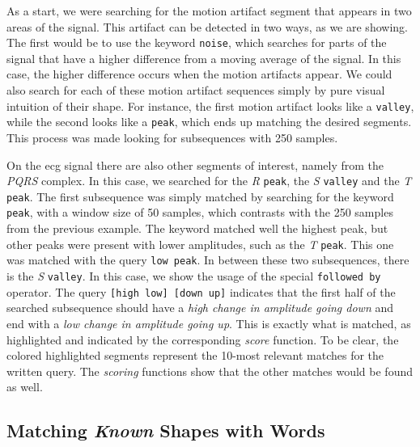 As a start, we were searching for the motion artifact segment that appears in two areas of the signal. This artifact can be detected in two ways, as we are showing. The first would be to use the keyword \texttt{noise}, which searches for parts of the signal that have a higher difference from a moving average of the signal. In this case, the higher difference occurs when the motion artifacts appear. We could also search for each of these motion artifact sequences simply by pure visual intuition of their shape. For instance, the first motion artifact looks like a \texttt{valley}, while the second looks like a \texttt{peak}, which ends up matching the desired segments. This process was made looking for subsequences with 250 samples.
\par
On the \gls{ecg} signal there are also other segments of interest, namely from the \textit{PQRS} complex. In this case, we searched for the \textit{R} \texttt{peak}, the \textit{S} \texttt{valley} and the \textit{T} \texttt{peak}. The first subsequence was simply matched by searching for the keyword \texttt{peak}, with a window size of 50 samples, which contrasts with the 250 samples from the previous example. The keyword matched well the highest peak, but other peaks were present with lower amplitudes, such as the \textit{T} \texttt{peak}. This one was matched with the query \texttt{low peak}. In between these two subsequences, there is the \textit{S} \texttt{valley}. In this case, we show the usage of the special \texttt{followed by} operator. The query \texttt{[high low] [down up]} indicates that the first half of the searched subsequence should have a \textit{high change in amplitude going down} and end with a \textit{low change in amplitude going up}. This is exactly what is matched, as highlighted and indicated by the corresponding \textit{score} function. To be clear, the colored highlighted segments represent the 10-most relevant matches for the written query. The \textit{scoring} functions show that the other matches would be found as well.



\subsection{Matching \textit{Known} Shapes with Words}

